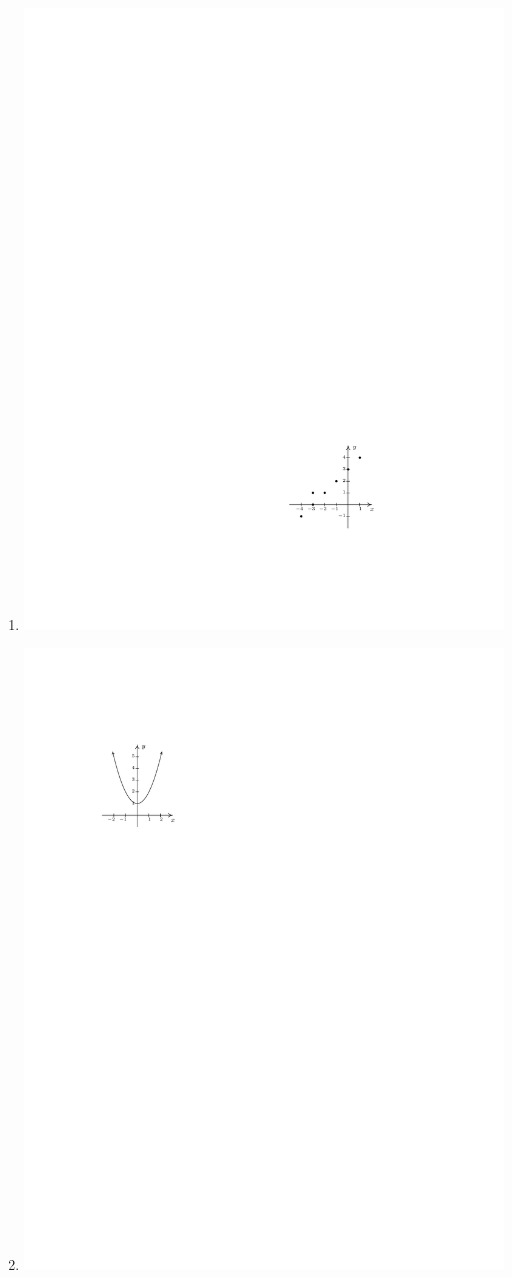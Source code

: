 \documentclass{ximera}
\begin{document}
\begin{exercise}
\begin{enumerate}
\item{\includegraphics{WiaFgraphs1-2}}
\item{\includegraphics{WiaFgraphs1-3}}

\end{enumerate}
\end{exercise}
\end{document}
